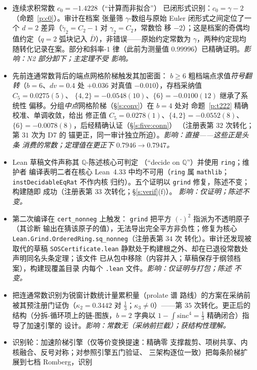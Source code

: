 \documentclass[11pt]{article}
\numberwithin{equation}{section}
\theoremstyle{definition}
\theoremstyle{remark}
\begin{document}
\begin{itemize}
\item[D9.] 连续求积常数 $c_0=-1.4228$（``计算而非拟合''）
已闭形式识别：$c_0=\gamma-2$（命题~\ref{p:c0}）。审计在档案
张量筛 $\gamma$-数组与原始 Euler 闭形式之间定位了一个 $d=2$
差异（$\widetilde\gamma_2=C_2-1$ 对 $\gamma_2=C_2$，常数恰
移 $-2$）；这是档案的奇偶均值约定（$q=2$ 弧块记入
$\bar D$），非错误——原始约定常数为 $\gamma$，两种约定现均
随转化记录在案。部分和斜率-$1$ 律（此前为测量值
$0.99996$）已精确证明。\emph{影响：N2 部分卸下；主定理不受
影响。}
\item[D10.] 先前连通常数背后的端点网格阶梯触发其加密面：
$b\ge6$ 粗档端点求值\emph{符号翻转}（$b=6$、$dv=0.4$ 处
$+0.036$ 对真值 $-0.010$），存档采纳值 $C_5=0.0275(5)$、
$\{4,2\}=-0.0548(10)$、$\{6\}=-0.0100(12)$ 继承了系统性
偏移。分组\emph{中点}网格阶梯（\S\ref{s:conv}）在 $b=4$ 处对
命题~\ref{p:t222} 精确校准、单调收敛，给出
修正值 $C_5=0.0278(1)$、$\{4,2\}=-0.0552(8)$、
$\{6\}=-0.0078(8)$，后经精确认证（\S\ref{s:five:conn}）
（注册表第 $32$ 次转化；第 $31$ 次为 D7 的
锚更正，同一审计独立所迫）。\emph{影响：直接——这些正是头条
消费的常数；定理值在更正下 $0.7946\to0.7947$。}
\item[D11.] Lean 草稿文件声称其 $\mathbb Q$-陈述核心可判定
（``decide on $\mathbb Q$''）并使用 \texttt{ring}；维护者
编译表明二者在核心 Lean~4.33 中均不可用（\texttt{ring} 属
\texttt{mathlib}；\texttt{instDecidableEqRat} 不作内核
归约）。五个证明以 \texttt{grind} 修复，陈述不变；构建随即
成功（注册表第 $33$ 次转化；\S\ref{s:verif}(f)）。
\emph{影响：仅证明；陈述不变。}
\item[D12.] 第二次编译在 \texttt{cert\_nonneg} 上触发：
\texttt{grind} 把平方 $(\cdot)^2$ 指派为不透明原子（其诊断
输出在猜该原子的值），无法导出完全平方非负性；修复为核心
\texttt{Lean.Grind.OrderedRing.sq\_nonneg}（注册表第 $34$ 次
转化）。审计还发现被取代的草稿 \texttt{SOSCertificate.lean}
静默处于构建根之外、却在已退役常数处声明同名头条定理；该文件
已从包中移除（内容并入；草稿保存于纲领档案），构建现覆盖目录
内每个 \texttt{.lean} 文件。\emph{影响：仅证明与打包；陈述
不变。}
\item[D14.] 把连通常数识别为锐窗计数统计量累积量（prolate 谱
路线）的方案在采纳前被其预注册门证伪（$\kappa_2=0.3442$ 对
$\tfrac13$；$\kappa_3\ne0$）——第 $35$ 次转化。更正后的
结构（分拆-循环项上的链-图族，$b=2$ 字典以
$1-\int\mathrm{sinc}^4=\tfrac13$ 精确闭合）指导了加速引擎的
设计。\emph{影响：常数无（采纳前拦截）；获结构性理解。}
\item[D15.] 识别轮：加速阶梯引擎（仅等价变换提速：精确零
支撑裁剪、项树共享、内核融合、反号对称；对参照引擎五门验证、
三架构逐位一致）把每条阶梯扩展到七档 Romberg，识别

\end{itemize}
\end{document}

